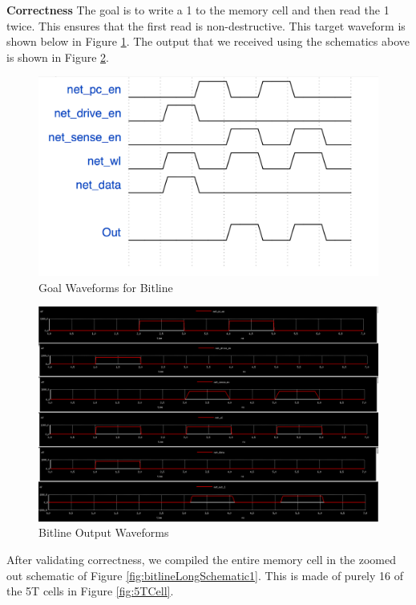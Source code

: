 \documentclass[a4paper]{article}
\begin{document}
\textbf{Correctness}
The goal is to write a 1 to the memory cell and then read the 1 twice. This ensures that the first read is non-destructive. This target waveform is shown below in Figure \ref{fig:bitlineGoalWave}. The output that we received using the schematics above is shown in Figure \ref{fig:bitlineActualWave}.

\begin{figure}[H]
	\centering
	\includegraphics[scale=0.4]{exampleBitlineGoalWaveform}
	\caption{Goal Waveforms for Bitline}
	\label{fig:bitlineGoalWave}
\end{figure}

\begin{figure}[H]
	\centering
	\includegraphics[scale=0.25]{exampleBitlineOutputWaveform}
	\caption{Bitline Output Waveforms}
	\label{fig:bitlineActualWave}
\end{figure}

After validating correctness, we compiled the entire memory cell in the zoomed out schematic of Figure \ref{fig:bitlineLongSchematic1}. This is made of purely 16 of the 5T cells in Figure \ref{fig:5TCell}.
\end{document}
